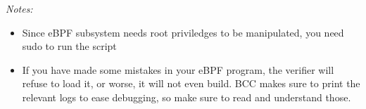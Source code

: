 {\em Notes:
\begin{itemize}
    \item Since eBPF subsystem needs root priviledges to be manipulated, you need sudo to run the script
    \item If you have made some mistakes in your eBPF program, the verifier
    will refuse to load it, or worse, it will not even build. BCC makes sure to
    print the relevant logs to ease debugging, so make sure to read
    and understand those.
\end{itemize}}

